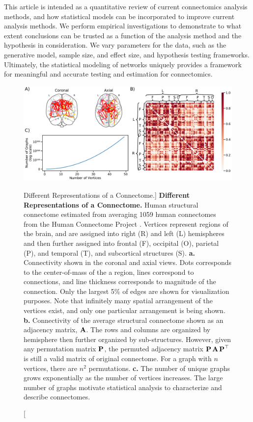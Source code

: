 This article is intended as a quantitative review of current connectomics analysis methods, and how statistical models can be incorporated to improve current analysis methods. We perform empirical investigations to demonstrate to what extent conclusions can be trusted as a function of the analysis method and the hypothesis in consideration. We vary parameters for the data, such as the generative model, sample size, and effect size, and hypothesis testing frameworks. Ultimately, the statistical modeling of networks uniquely provides a framework for meaningful and accurate testing and estimation for connectomics.

\begin{figure}
    \centering
    \includegraphics[width=\textwidth]{figures/dnd/intro}
    \caption
    [Different Representations of a Connectome.]
    {\textbf{Different Representations of a Connectome.} 
    Human structural connectome estimated from averaging 1059 human connectomes from the Human Connectome Project \cite{hcp1}.
    Vertices represent regions of the brain, and are assigned into right (R) and left (L) hemispheres and then further assigned into frontal (F), occipital (O), parietal (P), and temporal (T), and subcortical structures (S). 
    \textbf{a.} Connectivity shown in the coronal and axial views. Dots corresponds to the center-of-mass of the a region, lines correspond to connections, and line thickness corresponds to magnitude of the connection. Only the largest 5\% of edges are shown for visualization purposes. Note that infinitely many spatial arrangement of the vertices exist, and only one particular arrangement is being shown.
    \textbf{b.} Connectivity of the average structural connectome shown as an adjacency matrix, $\operatorname{\mathbf{A}}$. The rows and columns are organized by hemisphere then further organized by sub-structures. However, given any permutation matrix $\operatorname{\mathbf{P}}$, the permuted adjacency matrix $\operatorname{\mathbf{P}}\operatorname{\mathbf{A}}\operatorname{\mathbf{P}}^\top$ is still a valid matrix of original connectome. For a graph with $n$ vertices, there are $n^2$ permutations.
    \textbf{c.} The number of unique graphs grows exponentially as the number of vertices increases. The large number of graphs motivate statistical analysis to characterize and describe connectomes.
    } 
    \label{fig:intro_fig}
\end{figure} 